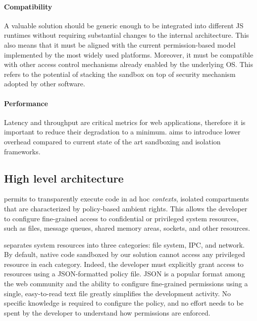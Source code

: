 \paragraph{Compatibility}
A valuable solution should be generic enough to be integrated into
different JS runtimes without requiring substantial changes to the
internal architecture. This also means that it must be aligned with
the current permission-based model implemented by the most widely used
platforms. Moreover, it must be compatible with other access control
mechanisms already enabled by the underlying OS. This refers to the
potential of stacking the sandbox on top of security mechanism adopted
by other software.

\paragraph{Performance}
Latency and throughput are critical metrics for web applications,
therefore it is important to reduce their degradation to a
minimum. \natisand aims to introduce lower overhead compared to current
state of the art sandboxing and isolation frameworks.


\subsection{High level architecture}
\label{sect:sandbox-overview}

\natisand permits to transparently execute code in ad hoc {\em contexts},
isolated compartments that are characterized by policy-based ambient
rights. This allows the developer to configure fine-grained access to
confidential or privileged system resources, such as files, message
queues, shared memory areas, sockets, and other resources.

\natisand separates system resources into three categories: file system,
IPC, and network. By default, native code sandboxed by our solution
cannot access any privileged resource in each category. Indeed, the
developer must explicitly grant access to resources using a
JSON-formatted policy file. JSON is a popular format among the web
community and the ability to configure fine-grained permissions using
a single, easy-to-read text file greatly simplifies the development
activity. No specific knowledge is required to configure the policy,
and no effort needs to be spent by the developer to understand how
permissions are enforced.

